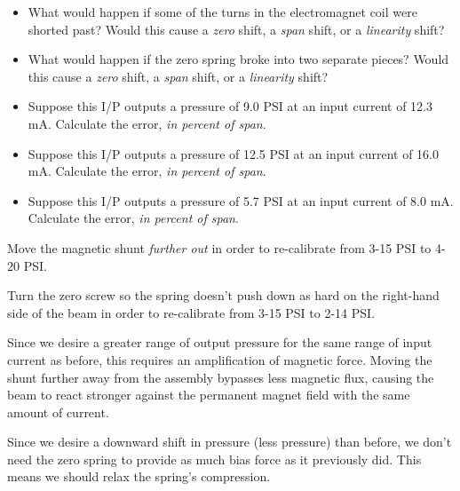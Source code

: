 \begin{itemize}
\item{} What would happen if some of the turns in the electromagnet coil were shorted past?  Would this cause a {\it zero} shift, a {\it span} shift, or a {\it linearity} shift?
\item{} What would happen if the zero spring broke into two separate pieces?  Would this cause a {\it zero} shift, a {\it span} shift, or a {\it linearity} shift?
\item{} Suppose this I/P outputs a pressure of 9.0 PSI at an input current of 12.3 mA.  Calculate the error, {\it in percent of span}.
\item{} Suppose this I/P outputs a pressure of 12.5 PSI at an input current of 16.0 mA.  Calculate the error, {\it in percent of span}.
\item{} Suppose this I/P outputs a pressure of 5.7 PSI at an input current of 8.0 mA.  Calculate the error, {\it in percent of span}.
\end{itemize}







Move the magnetic shunt {\it further out} in order to re-calibrate from 3-15 PSI to 4-20 PSI.

\vskip 10pt

Turn the zero screw so the spring doesn't push down as hard on the right-hand side of the beam in order to re-calibrate from 3-15 PSI to 2-14 PSI.







Since we desire a greater range of output pressure for the same range of input current as before, this requires an amplification of magnetic force.  Moving the shunt further away from the assembly bypasses less magnetic flux, causing the beam to react stronger against the permanent magnet field with the same amount of current.

\vskip 10pt

Since we desire a downward shift in pressure (less pressure) than before, we don't need the zero spring to provide as much bias force as it previously did.  This means we should relax the spring's compression.






